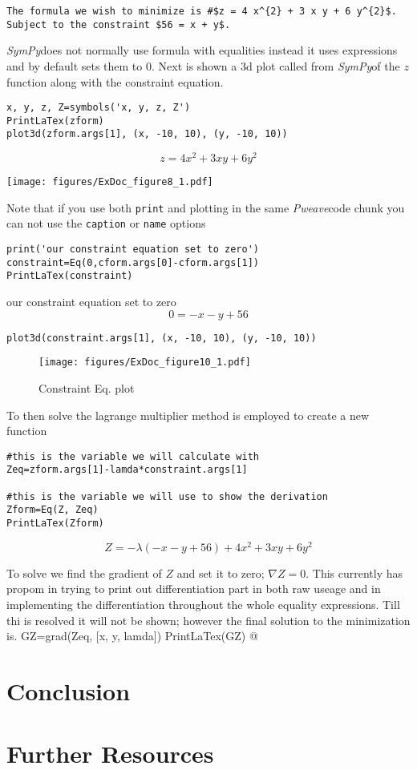 \documentclass[a4paper,11pt,final]{article}
\newcommand{\pweave}{\emph{Pweave}\space}
\newcommand{\sympy}{\emph{SymPy}\space}
\begin{document}
\begin{verbatim}
The formula we wish to minimize is #$z = 4 x^{2} + 3 x y + 6 y^{2}$.
Subject to the constraint $56 = x + y$.
\end{verbatim}


		\sympy does not normally use formula with equalities instead it uses expressions and by default sets them to $0$. Next is shown a 3d plot called from \sympy of the $z$ function along with the constraint equation.

\begin{verbatim}
x, y, z, Z=symbols('x, y, z, Z')
PrintLaTex(zform)
plot3d(zform.args[1], (x, -10, 10), (y, -10, 10))
\end{verbatim}
$$z = 4 x^{2} + 3 x y + 6 y^{2}$$

\texttt{[image: figures/ExDoc\_figure8\_1.pdf]}


		Note that if you use both \texttt{print} and plotting in the same \pweave code chunk you can not use the \texttt{caption} or \texttt{name} options


\begin{verbatim}
print('our constraint equation set to zero')
constraint=Eq(0,cform.args[0]-cform.args[1])
PrintLaTex(constraint)
\end{verbatim}
our constraint equation set to zero
$$0 = - x - y + 56$$



\begin{verbatim}
plot3d(constraint.args[1], (x, -10, 10), (y, -10, 10))
\end{verbatim}
\begin{figure}[htpb]
\center
\texttt{[image: figures/ExDoc\_figure10\_1.pdf]}
\caption{Constraint Eq. plot}
\label{fig:None}
\end{figure}


		To then solve the lagrange multiplier method is employed to create a new function

\begin{verbatim}
#this is the variable we will calculate with
Zeq=zform.args[1]-lamda*constraint.args[1]

#this is the variable we will use to show the derivation
Zform=Eq(Z, Zeq)
PrintLaTex(Zform)
\end{verbatim}
$$Z = - \lambda \left(- x - y + 56\right) + 4 x^{2} + 3 x y + 6
y^{2}$$



		To solve we find the gradient of $Z$ and set it to zero; $\nabla Z=0$. This currently has propom in trying to print out differentiation part  in both raw useage and in implementing the differentiation throughout the whole equality expressions. Till thi is resolved it will not be shown; however the final solution to the minimization is.
GZ=grad(Zeq, [x, y, lamda])
PrintLaTex(GZ)
@
        
\section{Conclusion}
\section{Further Resources}
\end{document}
